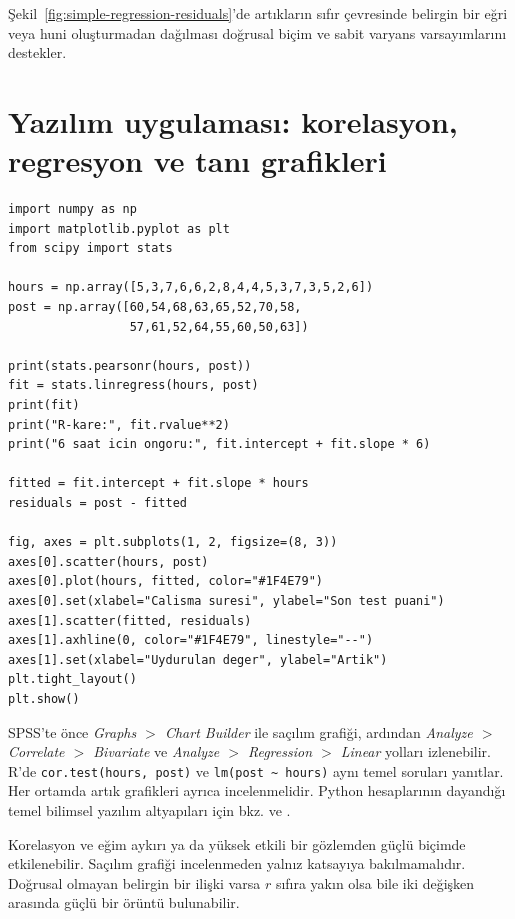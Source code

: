 Şekil~\ref{fig:simple-regression-residuals}'de artıkların sıfır çevresinde
belirgin bir eğri veya huni oluşturmadan
dağılması doğrusal biçim ve sabit varyans varsayımlarını destekler.

\section{Yazılım uygulaması: korelasyon, regresyon ve tanı grafikleri}

\begin{softwarebox}
\begin{lstlisting}
import numpy as np
import matplotlib.pyplot as plt
from scipy import stats

hours = np.array([5,3,7,6,6,2,8,4,4,5,3,7,3,5,2,6])
post = np.array([60,54,68,63,65,52,70,58,
                 57,61,52,64,55,60,50,63])

print(stats.pearsonr(hours, post))
fit = stats.linregress(hours, post)
print(fit)
print("R-kare:", fit.rvalue**2)
print("6 saat icin ongoru:", fit.intercept + fit.slope * 6)

fitted = fit.intercept + fit.slope * hours
residuals = post - fitted

fig, axes = plt.subplots(1, 2, figsize=(8, 3))
axes[0].scatter(hours, post)
axes[0].plot(hours, fitted, color="#1F4E79")
axes[0].set(xlabel="Calisma suresi", ylabel="Son test puani")
axes[1].scatter(fitted, residuals)
axes[1].axhline(0, color="#1F4E79", linestyle="--")
axes[1].set(xlabel="Uydurulan deger", ylabel="Artik")
plt.tight_layout()
plt.show()
\end{lstlisting}
SPSS'te önce \emph{Graphs $>$ Chart Builder} ile saçılım grafiği, ardından
\emph{Analyze $>$ Correlate $>$ Bivariate} ve
\emph{Analyze $>$ Regression $>$ Linear} yolları izlenebilir. R'de
\texttt{cor.test(hours, post)} ve \texttt{lm(post \textasciitilde{} hours)}
aynı temel soruları yanıtlar. Her ortamda artık grafikleri ayrıca
incelenmelidir. Python hesaplarının dayandığı temel bilimsel yazılım
altyapıları için bkz. \citet{harris2020} ve \citet{virtanen2020}.
\end{softwarebox}

\begin{assumptionbox}
Korelasyon ve eğim aykırı ya da yüksek etkili bir gözlemden güçlü biçimde
etkilenebilir. Saçılım grafiği incelenmeden yalnız katsayıya bakılmamalıdır.
Doğrusal olmayan belirgin bir ilişki varsa $r$ sıfıra yakın olsa bile iki
değişken arasında güçlü bir örüntü bulunabilir.
\end{assumptionbox}

